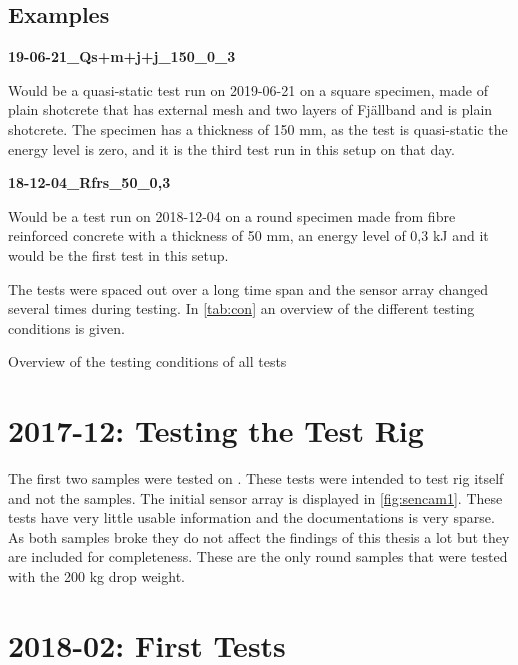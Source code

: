 \subsection*{Examples}

\centering
\textbf{19-06-21\_Qs+m+j+j\_150\_0\_3}
\flushleft

Would be a quasi-static test run on 2019-06-21 on a square specimen, made of plain shotcrete that has external mesh and two layers of Fjällband and is plain shotcrete. The specimen has a thickness of 150 mm, as the test is quasi-static the energy level is zero, and it is the third test run in this setup on that day.

\medskip
\centering
\textbf{18-12-04\_Rfrs\_50\_0,3}
\flushleft

Would be a test run on 2018-12-04 on a round specimen made from fibre reinforced concrete with a thickness of 50 mm, an energy level of 0,3 kJ and it would be the first test in this setup.


The tests were spaced out over a long time span and the sensor array changed several times during testing. In \autoref{tab:con} an overview of the different testing conditions is given. 


\begin{table}
    \centering

\caption{Overview of the testing conditions of all tests}
\label{tab:con}
\end{table}

 
\section{2017-12: Testing the Test Rig}
 
 
The first two samples were tested on . These tests were intended to test rig itself and not the samples. The initial sensor array is displayed in \autoref{fig:sencam1}. These tests have very little usable information and the documentations is very sparse. As both samples broke they do not affect the findings of this thesis a lot but they are included for completeness. These are the only round samples that were tested with the 200 kg drop weight. 

\section{2018-02: First Tests}


